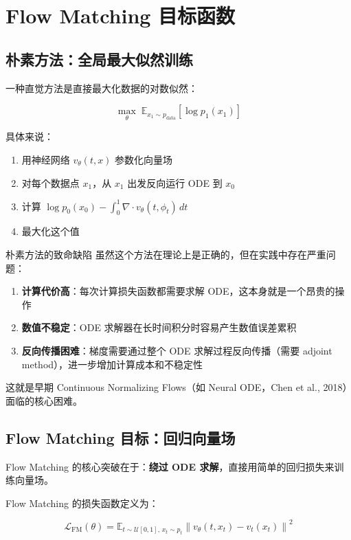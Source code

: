 \documentclass[a4paper]{article}
\begin{document}
\section{Flow Matching 目标函数}

\subsection{朴素方法：全局最大似然训练}

一种直觉方法是直接最大化数据的对数似然：

$$\max_\theta \; \mathbb{E}_{x_1 \sim p_{\text{data}}} \left[ \log p_1(x_1) \right]$$

具体来说：
\begin{enumerate}
    \item 用神经网络 $v_\theta(t, x)$ 参数化向量场
    \item 对每个数据点 $x_1$，从 $x_1$ 出发反向运行 ODE 到 $x_0$
    \item 计算 $\log p_0(x_0) - \int_0^1 \nabla \cdot v_\theta(t, \phi_t) \, dt$
    \item 最大化这个值
\end{enumerate}

\begin{warningbox}{朴素方法的致命缺陷}
虽然这个方法在理论上是正确的，但在实践中存在严重问题：
\begin{enumerate}
    \item \textbf{计算代价高}：每次计算损失函数都需要求解 ODE，这本身就是一个昂贵的操作
    \item \textbf{数值不稳定}：ODE 求解器在长时间积分时容易产生数值误差累积
    \item \textbf{反向传播困难}：梯度需要通过整个 ODE 求解过程反向传播（需要 adjoint method），进一步增加计算成本和不稳定性
\end{enumerate}
这就是早期 Continuous Normalizing Flows（如 Neural ODE，Chen et al., 2018）面临的核心困难。
\end{warningbox}

\subsection{Flow Matching 目标：回归向量场}

Flow Matching 的核心突破在于：\textbf{绕过 ODE 求解}，直接用简单的回归损失来训练向量场。

Flow Matching 的损失函数定义为：

$$\mathcal{L}_{\text{FM}}(\theta) = \mathbb{E}_{t \sim \mathcal{U}[0,1], \, x_t \sim p_t} \left\| v_\theta(t, x_t) - v_t(x_t) \right\|^2$$
\end{document}

